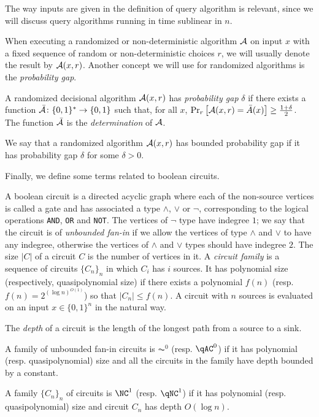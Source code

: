 The way inputs are given in the definition of query algorithm is relevant, since we will 
discuss query algorithms running in time sublinear in $n$. 

When executing a randomized or non-deterministic algorithm $\mathcal{A}$ on input $x$
with a fixed sequence of 
random or non-deterministic choices $r$, we will usually denote the result by $\mathcal{A}(x, r)$.
Another concept we will use for randomized algorithms is the \emph{probability gap}.

\begin{definition}
A randomized decisional algorithm $\mathcal{A}(x, r)$ has \emph{probability gap} $\delta$ if there exists a function
$\bar{\mathcal{A}} \colon \{0, 1\}^* \to \{0, 1\}$ such that, for all $x$, 
$\text{Pr}_{r}\left[\mathcal{A}(x, r) = \bar{A}(x)\right] \geq \frac{1 + \delta}{2}$. 
The function $\bar{\mathcal{A}}$ is the \emph{determination} of $\mathcal{A}$.

We say that a randomized algorithm $\mathcal{A}(x, r)$ has bounded probability gap if it has probability gap $\delta$
for some $\delta > 0$. 
\end{definition}

Finally, we define some terms related to boolean circuits. 

A boolean circuit is a directed acyclic graph where each of the non-source vertices is called a 
gate and has associated a type $\wedge$, $\vee$ or $\neg$, corresponding to the logical operations
\texttt{AND}, \texttt{OR} and \texttt{NOT}. The vertices of $\neg$ type have indegree $1$; we say
that the circuit is of \emph{unbounded fan-in} if we allow the vertices of type $\wedge$ and 
$\vee$ to have any indegree, otherwise the vertices of $\wedge$ and $\vee$ types should have
indegree $2$. The size $|C|$ of a circuit $C$ is the number of vertices in it.
A \emph{circuit family} is a sequence of circuits $\{C_n\}_{n}$ in which 
$C_i$ has $i$ sources. It has polynomial size (respectively, quasipolynomial size) if there exists
a polynomial $f(n)$ (resp. $f(n) = 2^{(\log n)^{O(1)}}$) so that $|C_n| \leq f(n)$.
A circuit with $n$ sources is evaluated on an input $x \in \{0, 1\}^n$ in the natural way. 

\begin{definition}
	The \emph{depth} of a circuit is the length of the longest path from a source to a sink.

	A family of unbounded fan-in circuits is $\AC^0$ (resp. $\qAC^0$) if it has polynomial
	(resp. quasipolynomial) size and all the circuits in the family
	have depth bounded by a constant. 

	A family $\{C_n\}_{n}$ of circuits is $\NC^1$  (resp. $\qNC^1$) if it has polynomial 
	(resp. quasipolynomial)
	size and circuit $C_n$
	has depth $O(\log n)$.
\end{definition}

